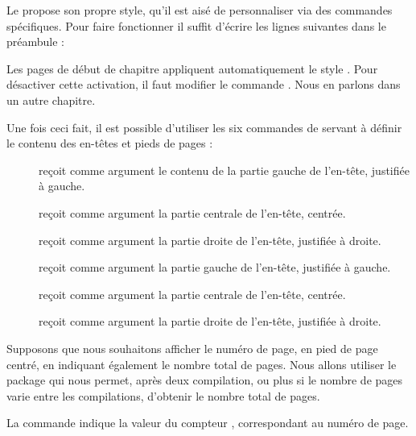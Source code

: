 Le  propose son propre style, qu'il est aisé de personnaliser via des commandes spécifiques. Pour faire fonctionner  il suffit d'écrire les lignes suivantes dans le préambule :
\begin{latexcode}
\usepackage{fancyhdr}
\pagestyle{fancy}
\end{latexcode}

\begin{plusloins}
Les pages de début de chapitre appliquent automatiquement le style . Pour désactiver cette activation, il faut modifier le commande . Nous en parlons dans un autre chapitre. 
\end{plusloins}


Une fois ceci fait, il est possible d'utiliser les six commandes de  servant à définir le contenu des en-têtes et pieds de pages :

\begin{description}
\item[] reçoit comme argument le contenu de la partie gauche de l'en-tête, justifiée à gauche.
\item[] reçoit comme argument la partie centrale de l'en-tête, centrée.
\item[] reçoit comme argument la partie droite de l'en-tête, justifiée à droite.
\item[] reçoit comme argument la partie gauche de l'en-tête, justifiée à gauche.
\item[] reçoit comme argument la partie centrale de l'en-tête, centrée.
\item[] reçoit comme argument la partie droite de l'en-tête, justifiée à droite.
\end{description}



Supposons que nous souhaitons afficher le numéro de page, en pied de page centré, en indiquant également le nombre total de pages. Nous allons utiliser le package  qui nous permet, après deux compilation, ou plus si le nombre de pages varie entre les compilations, d'obtenir le nombre total de pages.
\begin{latexcode}
\usepackage{fancyhdr}
\pagestyle{fancy}
\usepackage{totpages}
\cfoot{{\thepage} / \ref{TotPages}}
\end{latexcode}



La commande  indique la valeur du compteur , correspondant au numéro de page.

